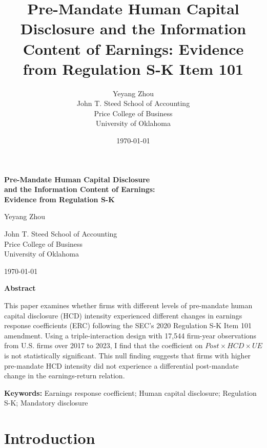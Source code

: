 \documentclass[12pt]{article}
\title{Pre-Mandate Human Capital Disclosure and the Information Content of Earnings: Evidence from Regulation S-K Item 101}
\author{Yeyang Zhou \\ John T. Steed School of Accounting \\ Price College of Business \\ University of Oklahoma}
\date{\today}
\begin{document}
\begin{titlepage}
\thispagestyle{empty}
\begin{singlespace}
\vspace*{1cm}
\begin{center}
{\Large\bfseries Pre-Mandate Human Capital Disclosure \\[0.2cm]
and the Information Content of Earnings: \\[0.2cm]
Evidence from Regulation S-K \par}
\vspace{0.9cm}
{\large Yeyang Zhou \par}
\vspace{0.3cm}
{\small John T. Steed School of Accounting \\
Price College of Business \\
University of Oklahoma \par}
\vspace{0.5cm}
{\small\today}
\end{center}

\vspace{1.0cm}

\begin{center}{\textbf{Abstract}}\end{center}
\vspace{-0.2cm}
{
\noindent This paper examines whether firms with different levels of pre-mandate human capital disclosure (HCD) intensity experienced different changes in earnings response coefficients (ERC) following the SEC's 2020 Regulation S-K Item 101 amendment. Using a triple-interaction design with 17{,}544 firm-year observations from U.S. firms over 2017 to 2023, I find that the coefficient on $Post \times HCD \times UE$ is not statistically significant. This null finding suggests that firms with higher pre-mandate HCD intensity did not experience a differential post-mandate change in the earnings-return relation. 
\par\vspace{0.4cm}
\noindent\textbf{Keywords:} Earnings response coefficient; Human capital disclosure; Regulation S-K; Mandatory disclosure
}

\vfill
\end{singlespace}
\end{titlepage}


\section{Introduction}
\end{document}
